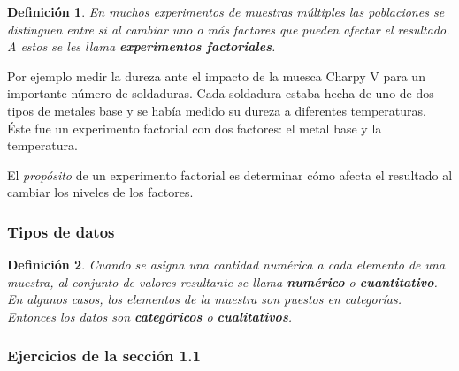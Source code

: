 \documentclass[10pt,a4paper]{book}
\newtheorem{defi}{\textbf{Definición}}
\begin{document}
\begin{defi}
	En muchos experimentos de muestras múltiples las poblaciones se distinguen entre si al cambiar uno o más factores que pueden afectar el resultado. A estos se les llama \textbf{experimentos factoriales}.
\end{defi}

Por ejemplo medir la dureza ante el impacto de la muesca Charpy V para un importante número de soldaduras. Cada soldadura estaba hecha de uno de dos tipos de metales base y se había medido su dureza a diferentes temperaturas. Éste fue un experimento factorial con dos factores: el metal base y la temperatura.

El \textit{propósito} de un experimento factorial es determinar cómo afecta el resultado al cambiar los niveles de los factores.

\subsubsection{Tipos de datos}

\begin{defi}
	Cuando se asigna una cantidad numérica a cada elemento de una muestra, al conjunto de valores resultante se llama \textbf{numérico} o \textbf{cuantitativo}. En algunos casos, los elementos de la muestra son puestos en categorías. Entonces los datos son \textbf{categóricos} o \textbf{cualitativos}.
\end{defi}

\subsubsection{Ejercicios de la sección 1.1}
\end{document}
